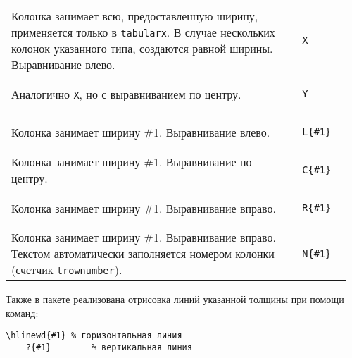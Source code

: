 \noindent
\begin{longtable}{C{0.82\linewidth} S{0.145\linewidth}}
    Колонка занимает всю, предоставленную ширину, применяется только в \texttt{tabularx}. В случае
    нескольких колонок указанного типа, создаются равной ширины. Выравнивание влево. &
        \begin{lstlisting}[style = listtable, gobble = 6, keepspaces = \false]
            X
        \end{lstlisting} \\
    Аналогично \texttt{X}, но с выравниванием по центру. &
        \begin{lstlisting}[style = listtable, gobble = 6, keepspaces = \false]
            Y
        \end{lstlisting} \\
    Колонка занимает ширину \#1. Выравнивание влево. &
        \begin{lstlisting}[style = listtable, gobble = 8, keepspaces = \false]
            L{#1}
        \end{lstlisting} \\
    Колонка занимает ширину \#1. Выравнивание по центру. &
        \begin{lstlisting}[style = listtable, gobble = 8, keepspaces = \false]
            C{#1}
        \end{lstlisting} \\
    Колонка занимает ширину \#1. Выравнивание вправо. &
        \begin{lstlisting}[style = listtable, gobble = 8, keepspaces = \false]
            R{#1}
        \end{lstlisting} \\
    Колонка занимает ширину \#1. Выравнивание вправо. Текстом автоматически заполняется номером колонки
    (счетчик \texttt{trownumber}).  &
        \begin{lstlisting}[style = listtable, gobble = 8, keepspaces = \false]
            N{#1}
        \end{lstlisting} \\
\end{longtable}

Также в пакете реализована отрисовка линий указанной толщины при помощи команд:
\begin{lstlisting}[style = listtable, gobble = 3]
    \hlinewd{#1} % горизонтальная линия
    ?{#1}        % вертикальная линия
\end{lstlisting}

\vspace{0.2cm}

